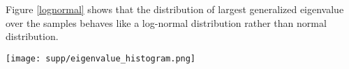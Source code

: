 
Figure \ref{lognormal} shows that the distribution of largest generalized eigenvalue over the samples behaves like a log-normal distribution rather than normal distribution.
\begin{figure*}[h!]
\centering
  \texttt{[image: supp/eigenvalue\_histogram.png]}
\caption{\em The histogram plot of eigenvalue of Gatys(blue) and ACG(green) shows a log-normal distribution over the samples.     }
\label{lognormal}
\vspace{-3mm}
\end{figure*}
\FloatBarrier
